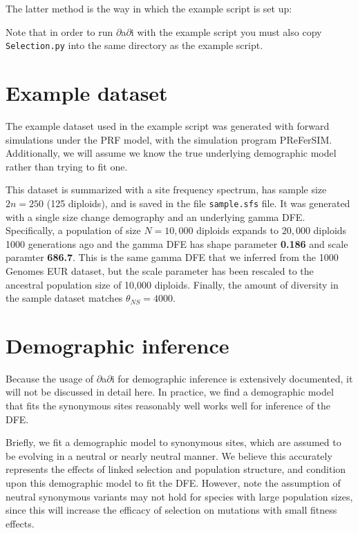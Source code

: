 \documentclass[11pt]{article}
\begin{document}
The latter method is the way in which the example script is set up:



Note that in order to run $\partial$a$\partial$i with the example script you must also copy \texttt{Selection.py} into the same directory as the example script.

\section{Example dataset}
The example dataset used in the example script was generated with forward simulations under the PRF model, with the simulation program PReFerSIM. Additionally, we will assume we know the true underlying demographic model rather than trying to fit one.

This dataset is summarized with a site frequency spectrum, has sample size $2n=250$ (125 diploids), and is saved in the file \texttt{sample.sfs} file. It was generated with a single size change demography and an underlying gamma DFE. Specifically, a population of size $N=10,000$ diploids expands to $20,000$ diploids 1000 generations ago and the gamma DFE has shape parameter \textbf{0.186} and scale paramter \textbf{686.7}. This is the same gamma DFE that we inferred from the 1000 Genomes EUR dataset, but the scale parameter has been rescaled to the ancestral population size of 10,000 diploids. Finally, the amount of diversity in the sample dataset matches $\theta_{NS}=4000$.

\section{Demographic inference}

Because the usage of $\partial$a$\partial$i for demographic inference is extensively documented, it will not be discussed in detail here. In practice, we find a demographic model that fits the synonymous sites reasonably well works well for inference of the DFE.  

Briefly, we fit a demographic model to synonymous sites, which are assumed to be evolving in a neutral or nearly neutral manner. We believe this accurately represents the effects of linked selection and population structure, and condition upon this demographic model to fit the DFE. However, note the assumption of neutral synonymous variants may not hold for species with large population sizes, since this will increase the efficacy of selection on mutations with small fitness effects.
\end{document}
